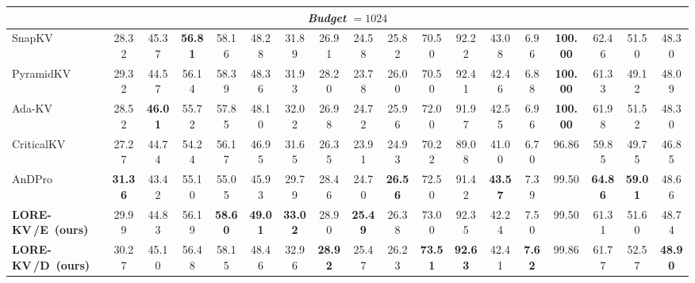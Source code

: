 \documentclass{article} %
\newcommand{\best}[1]{\textcolor{bestblue}{\textbf{#1}}}
\newcommand{\second}[1]{\textcolor{secondorange}{#1}}
\newcommand{\lorekvE}{LORE-KV\,/E}
\newcommand{\lorekvD}{LORE-KV\,/D}
\begin{document}
\begin{table}[t]
{\begin{tabular}{lccccccccccccccccc}
\midrule
\multicolumn{18}{c}{\textit{Budget} $=1024$} \\
\midrule
SnapKV & 28.32 & \second{45.37} & \best{56.81} & 58.16 & 48.28 & 31.89 & 26.91 & 24.58 & 25.82 & 70.50 & 92.22 & \second{43.08} & 6.96 & \best{100.00} & \second{62.46} & 51.50 & 48.30 \\
PyramidKV & 29.32 & 44.57 & 56.14 & \second{58.39} & 48.36 & 31.93 & 28.20 & 23.78 & 26.00 & 70.50 & \second{92.41} & 42.46 & 6.88 & \best{100.00} & 61.33 & 49.12 & 48.09 \\
Ada-KV & 28.52 & \best{46.01} & 55.72 & 57.85 & 48.10 & 32.02 & 26.98 & 24.72 & 25.96 & 72.00 & 91.97 & 42.55 & 6.96 & \best{100.00} & 61.98 & 51.52 & 48.30 \\
CriticalKV & 27.27 & 44.74 & 54.24 & 56.17 & 46.95 & 31.65 & 26.35 & 23.91 & 24.93 & 70.22 & 89.08 & 41.00 & 6.70 & 96.86 & 59.85 & 49.75 & 46.85 \\
AnDPro & \best{31.36} & 43.42 & 55.10 & 55.05 & 45.93 & 29.79 & 28.46 & 24.70 & \best{26.56} & 72.50 & 91.42 & \best{43.57} & 7.39 & 99.50 & \best{64.86} & \best{59.01} & 48.66 \\
\textbf{\lorekvE\ (ours)} & 29.99 & 44.83 & 56.19 & \best{58.60} & \best{49.01} & \best{33.02} & \second{28.90} & \best{25.49} & \second{26.38} & \second{73.00} & 92.35 & 42.24 & \second{7.50} & 99.50 & 61.31 & 51.60 & \second{48.74} \\
\textbf{\lorekvD\ (ours)} & \second{30.27} & 45.10 & \second{56.48} & 58.15 & \second{48.46} & \second{32.96} & \best{28.92} & \second{25.47} & 26.23 & \best{73.51} & \best{92.63} & 42.41 & \best{7.62} & \second{99.86} & 61.77 & \second{52.57} & \best{48.90} \\
\bottomrule
\end{tabular}%
}
\end{table}
\end{document}
